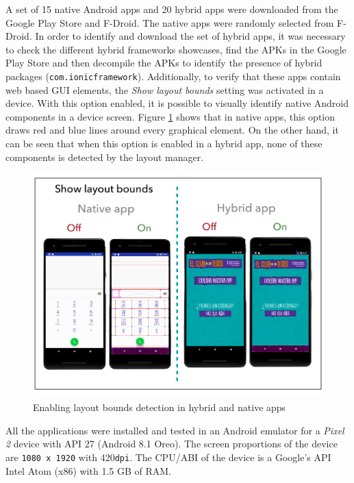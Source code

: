 A set of 15 native Android apps and 20 hybrid apps were downloaded from the Google Play Store and F-Droid. The native apps were randomly selected from F-Droid. In order to identify and download the set of hybrid apps, it was necessary to check the different hybrid frameworks showcases, find the APKs in the Google Play Store and then decompile the APKs to identify the presence of hybrid packages (\eg \verb|com.ionicframework|). Additionally, to verify that these apps contain web based GUI elements, the \textit{Show layout bounds} setting was activated in a device. With this option enabled, it is possible to visually identify native Android components in a device screen. Figure \ref{layoutBounds} shows that in native apps, this option draws red and blue lines around every graphical element. On the other hand, it can be seen that when this option is enabled in a hybrid app, none of these components is detected by the layout manager.

\begin{figure}[t]
	\centering
	\includegraphics[width=1\textwidth]{img/layout.pdf}
	\vspace{-0.8cm}
	\caption{Enabling layout bounds detection in hybrid and native apps}
	\label{layoutBounds}
\end{figure} 


All the applications were installed and tested in an Android emulator for a \textit{Pixel 2} device with API 27 (Android 8.1 Oreo).  The screen proportions of the device are \verb|1080 x 1920| with 420\verb|dpi|.  The CPU/ABI of the device is a Google's API Intel Atom (x86) with 1.5 GB of RAM.

